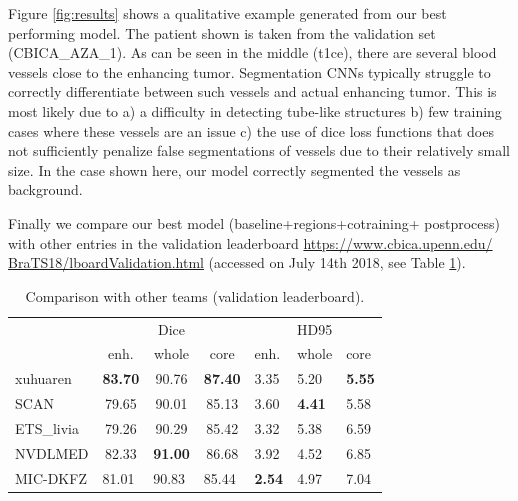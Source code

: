 \documentclass{templates/llncs} %
\begin{document}
  Figure \ref{fig:results} shows a qualitative example generated from our best performing model. The patient shown is taken from the validation set (CBICA\_AZA\_1). As can be seen in the middle (t1ce), there are several blood vessels close to the enhancing tumor. Segmentation CNNs typically struggle to correctly differentiate between such vessels and actual enhancing tumor. This is most likely due to a) a difficulty in detecting tube-like structures b) few training cases where these vessels are an issue c) the use of dice loss functions that does not sufficiently penalize false segmentations of vessels due to their relatively small size. In the case shown here, our model correctly segmented the vessels as background.
  
  Finally we compare our best model (baseline+regions+cotraining+ postprocess) with other entries in the validation leaderboard  \href{https://www.cbica.upenn.edu/BraTS18/lboardValidation.html}{https://www.cbica.upenn.edu/\\BraTS18/lboardValidation.html} (accessed on July 14th 2018, see Table \ref{tab:val_comp}).
  
\begin{table}[]
\begin{tabular}{lccclll}
\caption{Comparison with other teams (validation leaderboard).}
 & \multicolumn{3}{c}{Dice}     & \multicolumn{3}{c}{HD95}  \\
\multicolumn{1}{c}{} & enh.  & whole & core  & enh. & whole   & core \\
\hline
xuhuaren  & \textbf{83.70} & 90.76 & \textbf{87.40} & 3.35 & 5.20 & \textbf{5.55} \\
SCAN    & 79.65 & 90.01 & 85.13 & 3.60 & \textbf{4.41} & 5.58 \\
ETS\_livia  & 79.26 & 90.29 & 85.42 & 3.32 & 5.38 & 6.59 \\
NVDLMED & 82.33 & \textbf{91.00} & 86.68 & 3.92 & 4.52 & 6.85 \\
\hline
MIC-DKFZ  & \multicolumn{1}{l}{81.01} & \multicolumn{1}{l}{90.83} & \multicolumn{1}{l}{85.44} & \textbf{2.54} & 4.97 & 7.04   
\end{tabular}
\label{tab:val_comp}
\end{table}
\end{document}
